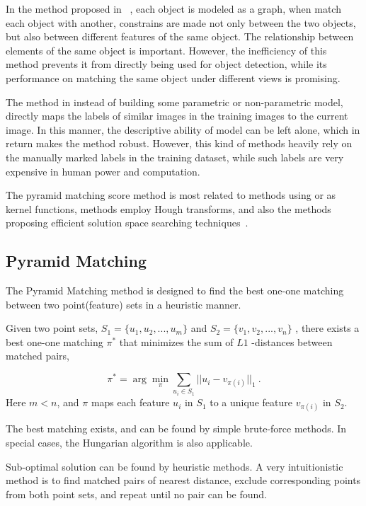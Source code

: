 In the method proposed in ~\cite{ac222}, each object is modeled as a graph, when match each object with another, constrains are made not only between the two objects, but also between different features of the same object. The relationship between elements of the same object is important. However, the inefficiency of this method prevents it from directly being used for object detection, while its performance on matching the same object under different views is promising.

The method in \cite{lbt1} instead of building some parametric or non-parametric model, directly maps the labels of similar images in the training images to the current image. In this manner, the descriptive ability of model can be left alone, which in return makes the method robust. However, this kind of methods heavily rely on the manually marked labels in the training dataset, while such labels are very expensive in human power and computation.

The pyramid matching score method is most related to methods using \cite{pmk} or \cite{kmts} as kernel functions, methods employ Hough transforms, and also the methods proposing efficient solution space searching techniques~\cite{bab}.





\subsection{Pyramid Matching}

The Pyramid Matching method is designed to find the best one-one matching between two point(feature) sets in a heuristic manner.

Given two point sets, ${S_1} = \{ {u_1},{u_2},...,{u_m}\} $
 and ${S_2} = \{ {v_1},{v_2},...,{v_n}\} $
, there exists a best one-one matching ${\pi}^*$ that minimizes the sum of $L1$
-distances between matched pairs,

\[
{\pi ^*} = \arg \mathop {\min }\limits_\pi  \sum\limits_{{u_i} \in {S_1}} {||{u_i} - {v_{\pi (i)}}|{|_1}} \ .
\]
Here $m<n$, and $\pi$ maps each feature $u_i$ in $S_1$ to a unique feature ${{v_{\pi (i)}}}
$ in $S_2$.

The best matching exists, and can be found by simple brute-force methods. In special cases, the Hungarian algorithm is also applicable.

Sub-optimal solution can be found by heuristic methods. A very intuitionistic method is to find matched pairs of nearest distance, exclude corresponding points from both point sets, and repeat until no pair can be found.

